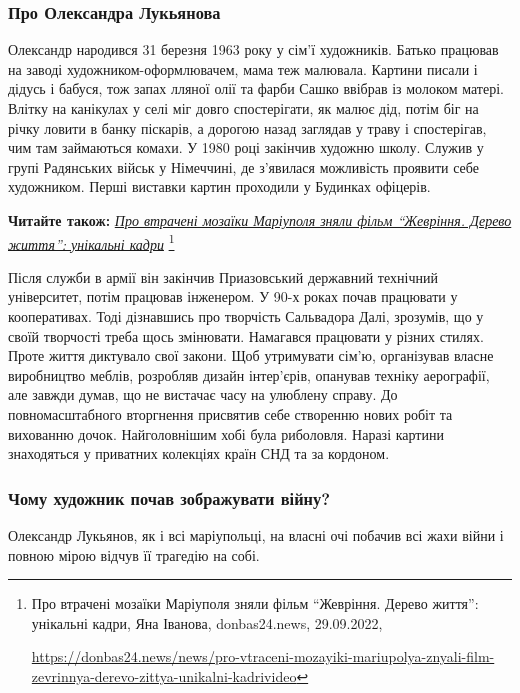\subsubsection{Про Олександра Лукьянова}

Олександр народився 31 березня 1963 року у сім'ї художників. Батько працював на
заводі художником-оформлювачем, мама теж малювала. Картини писали і дідусь і
бабуся, тож запах лляної олії та фарби Сашко ввібрав із молоком матері. Влітку
на канікулах у селі міг довго спостерігати, як малює дід, потім біг на річку
ловити в банку піскарів, а дорогою назад заглядав у траву і спостерігав, чим
там займаються комахи. У 1980 році закінчив художню школу. Служив у групі
Радянських військ у Німеччині, де з'явилася можливість проявити себе
художником. Перші виставки картин проходили у Будинках офіцерів.


\textbf{Читайте також:} \href{https://donbas24.news/news/pro-vtraceni-mozayiki-mariupolya-znyali-film-zevrinnya-derevo-zittya-unikalni-kadrivideo}{\emph{Про втрачені мозаїки Маріуполя зняли фільм \enquote{Жевріння. Дерево життя}: унікальні кадри}}%
\footnote{Про втрачені мозаїки Маріуполя зняли фільм \enquote{Жевріння. Дерево життя}: унікальні кадри, Яна Іванова, donbas24.news, 29.09.2022, \par%
\url{https://donbas24.news/news/pro-vtraceni-mozayiki-mariupolya-znyali-film-zevrinnya-derevo-zittya-unikalni-kadrivideo}%
}

Після служби в армії він закінчив Приазовський державний технічний університет,
потім працював інженером. У 90-х роках почав працювати у кооперативах. Тоді
дізнавшись про творчість Сальвадора Далі, зрозумів, що у своїй творчості треба
щось змінювати. Намагався працювати у різних стилях. Проте життя диктувало свої
закони. Щоб утримувати сім'ю, організував власне виробництво меблів, розробляв
дизайн інтер'єрів, опанував техніку аерографії, але завжди думав, що не
вистачає часу на улюблену справу. До повномасштабного вторгнення присвятив себе
створенню нових робіт та вихованню дочок. Найголовнішим хобі була риболовля.
Наразі картини знаходяться у приватних колекціях країн СНД та за кордоном.

\subsubsection{Чому художник почав зображувати війну?}

Олександр Лукьянов, як і всі маріупольці, на власні очі побачив всі жахи війни
і повною мірою відчув її трагедію на собі.

